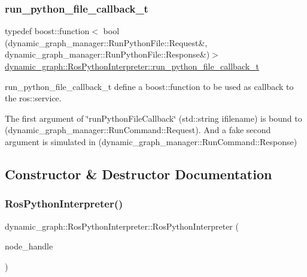 \subsubsection{\texorpdfstring{run\+\_\+python\+\_\+file\+\_\+callback\+\_\+t}{run\_python\_file\_callback\_t}}
{\footnotesize\ttfamily typedef boost\+::function$<$ bool (dynamic\+\_\+graph\+\_\+manager\+::\+Run\+Python\+File\+::\+Request\&, dynamic\+\_\+graph\+\_\+manager\+::\+Run\+Python\+File\+::\+Response\&)$>$ \hyperlink{classdynamic__graph_1_1RosPythonInterpreter_a802128e670817aa48dd8db54830a7977}{dynamic\+\_\+graph\+::\+Ros\+Python\+Interpreter\+::run\+\_\+python\+\_\+file\+\_\+callback\+\_\+t}}



run\+\_\+python\+\_\+file\+\_\+callback\+\_\+t define a boost\+::function to be used as callback to the ros\+::service. 

The first argument of \char`\"{}run\+Python\+File\+Callback\char`\"{} (std\+::string ifilename) is bound to (dynamic\+\_\+graph\+\_\+manager\+::\+Run\+Command\+::\+Request). And a fake second argument is simulated in (dynamic\+\_\+graph\+\_\+manager\+::\+Run\+Command\+::\+Response) 

\subsection{Constructor \& Destructor Documentation}
\mbox{\label{classdynamic__graph_1_1RosPythonInterpreter_a082493a5a7edd758b65a34fc9e617df5}} 
\subsubsection{\texorpdfstring{Ros\+Python\+Interpreter()}{RosPythonInterpreter()}}
{\footnotesize\ttfamily dynamic\+\_\+graph\+::\+Ros\+Python\+Interpreter\+::\+Ros\+Python\+Interpreter (\begin{DoxyParamCaption}\item[{ros\+::\+Node\+Handle \&}]{node\+\_\+handle }\end{DoxyParamCaption})\hspace{0.3cm}{\ttfamily [explicit]}}



